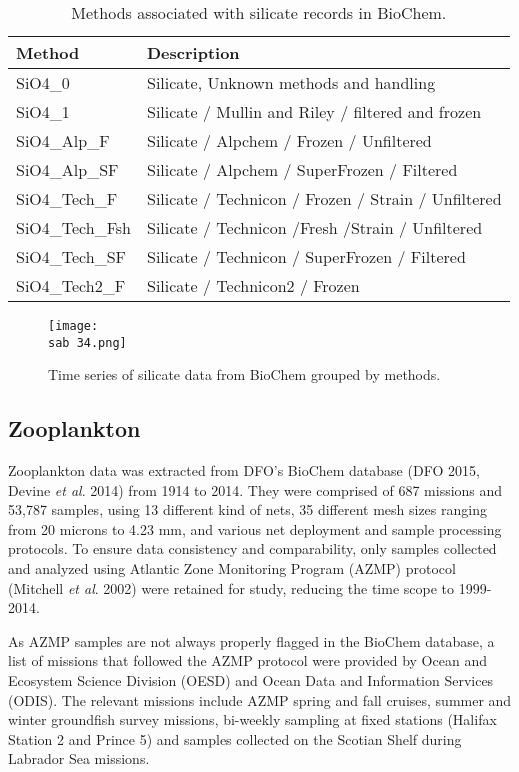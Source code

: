 \documentclass[letterpaper,portrait,11pt]{scrartcl}
\numberwithin{equation}{section}		%
\numberwithin{figure}{section}		%
\numberwithin{table}{section}				%
\newcommand{\ecomod}{\string~/ecomod_data/}   %
\newcommand{\sab}{\ecomod/mpa/sab/}   %
\begin{document}
\begin{appendices}
\begin{table}[h]
  \label{table:SilicateMethods}
  \caption{Methods associated with silicate records in BioChem.}
  \begin{tabular}{ll}
    Method & Description \\ \hline
    SiO4\_0 & Silicate, Unknown methods and handling \\
    SiO4\_1 & Silicate / Mullin and Riley / filtered and frozen \\
    SiO4\_Alp\_F & Silicate / Alpchem / Frozen / Unfiltered \\
    SiO4\_Alp\_SF & Silicate / Alpchem / SuperFrozen / Filtered \\
    SiO4\_Tech\_F & Silicate / Technicon / Frozen / Strain / Unfiltered \\
    SiO4\_Tech\_Fsh & Silicate / Technicon /Fresh /Strain / Unfiltered \\
    SiO4\_Tech\_SF & Silicate / Technicon / SuperFrozen / Filtered \\
    SiO4\_Tech2\_F & Silicate / Technicon2 / Frozen \\
  \end{tabular}
\end{table}


\begin{figure}[h]
  \label{fig:silicateTimeseries}
  \centering
  \texttt{[image: \\sab 34.png]}
  \caption{Time series of silicate data from BioChem grouped by methods.}
\end{figure}


\clearpage
\subsection{Zooplankton}

Zooplankton data was extracted from DFO's BioChem database (DFO 2015, Devine \textit{et al}. 2014) from 1914 to 2014. They were comprised of 687 missions and 53,787 samples, using 13 different kind of nets, 35 different mesh sizes ranging from 20 microns to 4.23 mm, and various net deployment and sample processing protocols.
To ensure data consistency and comparability, only samples collected and analyzed using Atlantic Zone Monitoring Program (AZMP) protocol (Mitchell \textit{et al}. 2002) were retained for study, reducing the time scope to 1999-2014. 

As AZMP samples are not always properly flagged in the BioChem database, a list of missions that followed the AZMP protocol were provided by Ocean and Ecosystem Science Division (OESD) and Ocean Data and Information Services (ODIS). The relevant missions include AZMP spring and fall cruises, summer and winter groundfish survey missions, bi-weekly sampling at fixed stations (Halifax Station 2 and Prince 5) and samples collected on the Scotian Shelf during Labrador Sea missions. 


\end{appendices}
\end{document}
